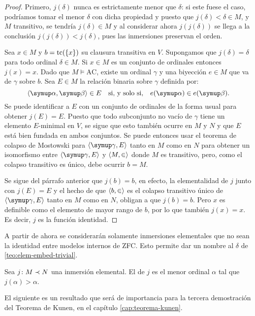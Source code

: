 \begin{proof}
    Primero, $j(\delta)$ nunca es estrictamente menor que $\delta$:
    si este fuese el caso, podríamos tomar el menor $\delta$ con dicha propiedad
    y puesto que $j(\delta) < \delta \in M$, y $M$ transitivo, se tendría
    $j(\delta)\in M$ y al considerar ahora $j(j(\delta))$ se llega a la conclusión
    $j(j(\delta)) < j(\delta)$, pues las inmersiones preservan el orden.

    Sea $x\in M$ y $b = \operatorname{tc}(\left\{ x \right\})$ su clausura transitiva en $V$.
    Supongamos que $j(\delta) = \delta$ para todo ordinal $\delta\in M$.
    Si $x\in M$ es un conjunto de ordinales entonces $j(x)=x$.
    Dado que $M\models \text{AC}$, existe un ordinal $\gamma$ y
    una biyección $e\in M$ que va de $\gamma$ sobre $b$.
    Sea $E\in M$ la relación binaria sobre $\gamma$ definida por:
    \[
        \op{\alpha, \beta}\in E\quad\text{si, y solo si,}\quad e(\alpha)\in e(\beta).
    \]
    Se puede identificar a $E$ con un conjunto de ordinales de la forma usual
    para obtener $j(E)=E$. Puesto que todo subconjunto no vacío de $\gamma$
    tiene un elemento $E$-minimal en $V$, se sigue que esto también ocurre en $M$ y $N$
    y que $E$ está bien fundada en ambos conjuntos.
    Se puede entonces usar el teorema de colapso de Mostowski para $\op{\gamma, E}$
    tanto en $M$ como en $N$ para obtener un isomorfismo entre $\op{\gamma, E}$
    y $\langle M,\in \rangle$ donde $M$ es transitivo, pero, como el colapso transitivo
    es único, debe ocurrir $b = M$.

    Se sigue del párrafo anterior que $j(b)=b$, en efecto,
    la elementalidad de $j$ junto con $j(E)=E$ y el hecho de que
    $\langle b,\in \rangle$ es el colapso transitivo único de $\op{\gamma, E}$
    tanto en $M$ como en $N$, obligan a que $j(b)=b$.
    Pero $x$ es definible como el elemento de mayor rango de $b$, por lo que también
    $j(x) = x$. Es decir, $j$ es la función identidad.
\end{proof}

A partir de ahora
se considerarán solamente inmersiones elementales que no sean la identidad
entre modelos internos de ZFC.
Esto permite dar un nombre al $\delta$ de \ref{teo:elem-embed-trivial}.

\begin{defi}
    Sea $j\colon M\prec N$ una inmersión elemental. El  de $j$
    es el menor ordinal $\alpha$ tal que $j(\alpha)>\alpha$.
\end{defi}

El siguiente es un resultado que será de importancia para la tercera
demostración del Teorema de Kunen, en el capítulo \ref{cap:teorema-kunen}.

